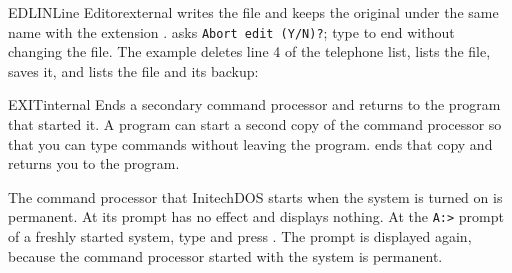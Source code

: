 \begin{DosEntry}{EDLIN}{Line Editor}{external}
 writes the file and keeps the original under the same name with the
extension .   asks \texttt{Abort edit (Y/N)?}; type
 to end without changing the file.
\Example
The example deletes line 4 of the telephone list, lists the file, saves it,
and lists the file and its backup:
\end{DosEntry}

\begin{DosEntry}{EXIT}{}{internal}
\Purpose Ends a secondary command processor and returns to the program that
started it.
\Format {}
\Remarks
A program can start a second copy of the command processor so that you can
type commands without leaving the program.   ends that copy and
returns you to the program.

The command processor that InitechDOS starts when the system is turned on
is permanent.  At its prompt  has no effect and displays nothing.
\Example
At the \texttt{A:\bs>} prompt of a freshly started system, type
 and press .  The prompt is displayed again, because
the command processor started with the system is permanent.
\end{DosEntry}

